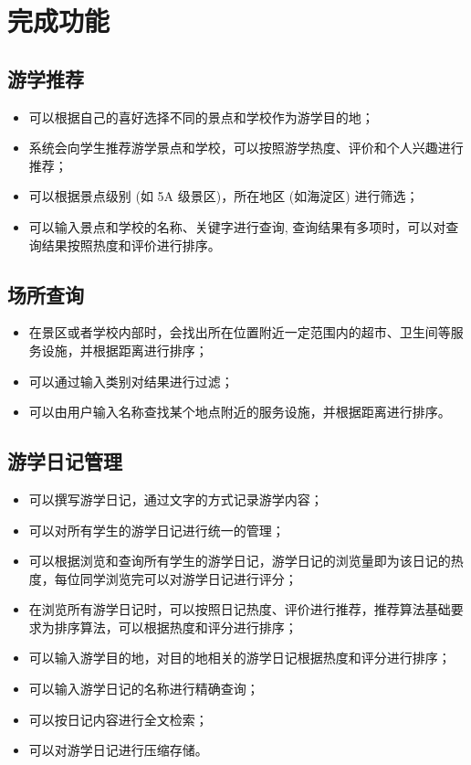 \documentclass{ctexart}
\begin{document}
\section{完成功能}

\subsection{游学推荐}

\begin{itemize}
    \item 可以根据自己的喜好选择不同的景点和学校作为游学目的地；
    \item 系统会向学生推荐游学景点和学校，可以按照游学热度、评价和个人兴趣进行推荐；
    \item 可以根据景点级别 (如 5A 级景区)，所在地区 (如海淀区) 进行筛选；
    \item 可以输入景点和学校的名称、关键字进行查询, 查询结果有多项时，可以对查询结果按照热度和评价进行排序。
\end{itemize}

\subsection{场所查询}

\begin{itemize}
    \item 在景区或者学校内部时，会找出所在位置附近一定范围内的超市、卫生间等服务设施，并根据距离进行排序；
    \item 可以通过输入类别对结果进行过滤；
    \item 可以由用户输入名称查找某个地点附近的服务设施，并根据距离进行排序。
\end{itemize}

\subsection{游学日记管理}

\begin{itemize}
    \item 可以撰写游学日记，通过文字的方式记录游学内容；
    \item 可以对所有学生的游学日记进行统一的管理；
    \item 可以根据浏览和查询所有学生的游学日记，游学日记的浏览量即为该日记的热度，每位同学浏览完可以对游学日记进行评分；
    \item 在浏览所有游学日记时，可以按照日记热度、评价进行推荐，推荐算法基础要求为排序算法，可以根据热度和评分进行排序；
    \item 可以输入游学目的地，对目的地相关的游学日记根据热度和评分进行排序；
    \item 可以输入游学日记的名称进行精确查询；
    \item 可以按日记内容进行全文检索；
    \item 可以对游学日记进行压缩存储。
\end{itemize}
\end{document}
